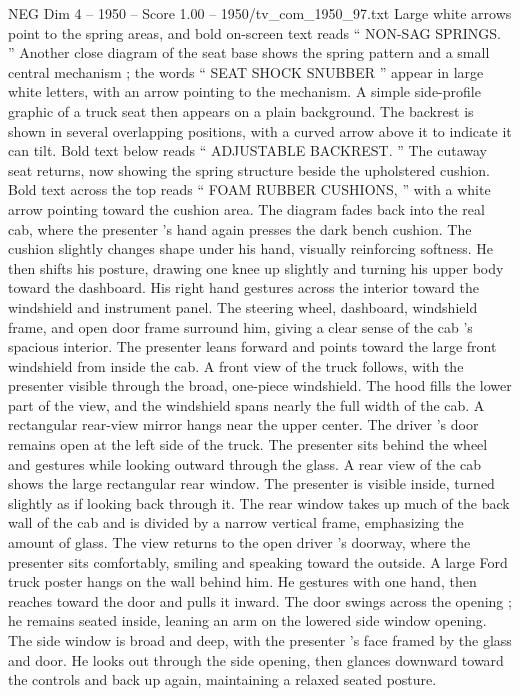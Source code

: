 \begin{textsample}{NEG Dim 4 – 1950 – Score 1.00 – 1950/tv\_com\_1950\_97.txt}
Large white arrows point to the spring areas, and bold on-screen text reads “ NON-SAG SPRINGS. ” Another close diagram of the seat base shows the spring pattern and a small central mechanism ; the words “ SEAT SHOCK SNUBBER ” appear in large white letters, with an arrow pointing to the mechanism.
A simple side-profile graphic of a truck seat then appears on a plain background.
The backrest is shown in several overlapping positions, with a curved arrow above it to indicate it can tilt.
Bold text below reads “ ADJUSTABLE BACKREST. ” The cutaway seat returns, now showing the spring structure beside the upholstered cushion.
Bold text across the top reads “ FOAM RUBBER CUSHIONS, ” with a white arrow pointing toward the cushion area.
The diagram fades back into the real cab, where the presenter ’s hand again presses the dark bench cushion.
The cushion slightly changes shape under his hand, visually reinforcing softness.
He then shifts his posture, drawing one knee up slightly and turning his upper body toward the dashboard.
His right hand gestures across the interior toward the windshield and instrument panel.
The steering wheel, dashboard, windshield frame, and open door frame surround him, giving a clear sense of the cab ’s spacious interior.
The presenter leans forward and points toward the large front windshield from inside the cab.
A front view of the truck follows, with the presenter visible through the broad, one-piece windshield.
The hood fills the lower part of the view, and the windshield spans nearly the full width of the cab.
A rectangular rear-view mirror hangs near the upper center.
The driver ’s door remains open at the left side of the truck.
The presenter sits behind the wheel and gestures while looking outward through the glass.
A rear view of the cab shows the large rectangular rear window.
The presenter is visible inside, turned slightly as if looking back through it.
The rear window takes up much of the back wall of the cab and is divided by a narrow vertical frame, emphasizing the amount of glass.
The view returns to the open driver ’s doorway, where the presenter sits comfortably, smiling and speaking toward the outside.
A large Ford truck poster hangs on the wall behind him.
He gestures with one hand, then reaches toward the door and pulls it inward.
The door swings across the opening ; he remains seated inside, leaning an arm on the lowered side window opening.
The side window is broad and deep, with the presenter ’s face framed by the glass and door.
He looks out through the side opening, then glances downward toward the controls and back up again, maintaining a relaxed seated posture.

\end{textsample}
